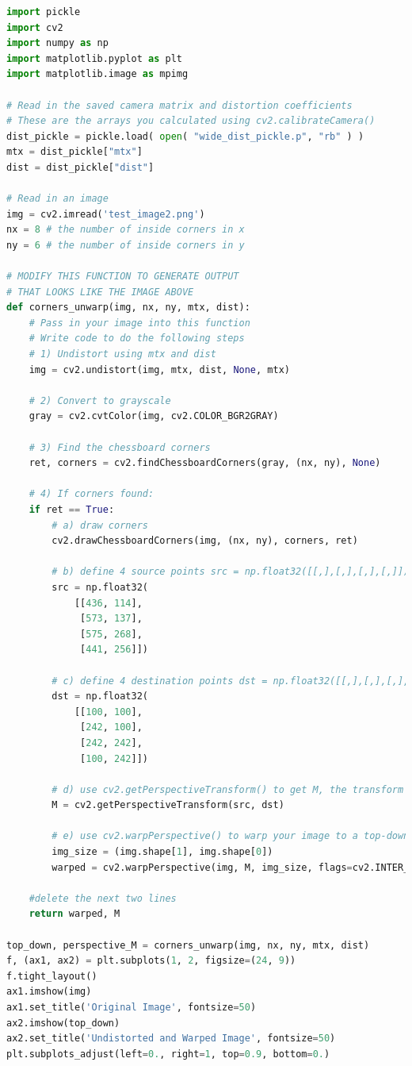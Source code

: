 \documentclass[12pt]{article}
\begin{document}
\begin{lstlisting}[language=Python]
import pickle
import cv2
import numpy as np
import matplotlib.pyplot as plt
import matplotlib.image as mpimg

# Read in the saved camera matrix and distortion coefficients
# These are the arrays you calculated using cv2.calibrateCamera()
dist_pickle = pickle.load( open( "wide_dist_pickle.p", "rb" ) )
mtx = dist_pickle["mtx"]
dist = dist_pickle["dist"]

# Read in an image
img = cv2.imread('test_image2.png')
nx = 8 # the number of inside corners in x
ny = 6 # the number of inside corners in y

# MODIFY THIS FUNCTION TO GENERATE OUTPUT 
# THAT LOOKS LIKE THE IMAGE ABOVE
def corners_unwarp(img, nx, ny, mtx, dist):
    # Pass in your image into this function
    # Write code to do the following steps
    # 1) Undistort using mtx and dist
    img = cv2.undistort(img, mtx, dist, None, mtx)
    
    # 2) Convert to grayscale
    gray = cv2.cvtColor(img, cv2.COLOR_BGR2GRAY)
    
    # 3) Find the chessboard corners
    ret, corners = cv2.findChessboardCorners(gray, (nx, ny), None)
    
    # 4) If corners found: 
    if ret == True:
        # a) draw corners
        cv2.drawChessboardCorners(img, (nx, ny), corners, ret)
        
        # b) define 4 source points src = np.float32([[,],[,],[,],[,]])
        src = np.float32(
            [[436, 114],
             [573, 137],
             [575, 268],
             [441, 256]])
        
        # c) define 4 destination points dst = np.float32([[,],[,],[,],[,]])
        dst = np.float32(
            [[100, 100],
             [242, 100],
             [242, 242],
             [100, 242]])
             
        # d) use cv2.getPerspectiveTransform() to get M, the transform matrix
        M = cv2.getPerspectiveTransform(src, dst)
        
        # e) use cv2.warpPerspective() to warp your image to a top-down view
        img_size = (img.shape[1], img.shape[0])
        warped = cv2.warpPerspective(img, M, img_size, flags=cv2.INTER_LINEAR)
        
    #delete the next two lines
    return warped, M

top_down, perspective_M = corners_unwarp(img, nx, ny, mtx, dist)
f, (ax1, ax2) = plt.subplots(1, 2, figsize=(24, 9))
f.tight_layout()
ax1.imshow(img)
ax1.set_title('Original Image', fontsize=50)
ax2.imshow(top_down)
ax2.set_title('Undistorted and Warped Image', fontsize=50)
plt.subplots_adjust(left=0., right=1, top=0.9, bottom=0.)
\end{lstlisting}
\end{document}
